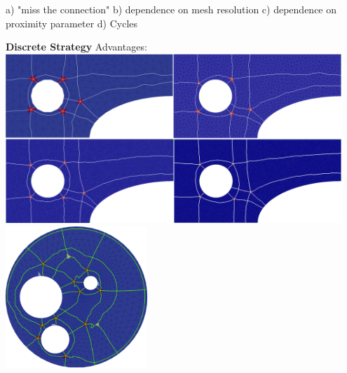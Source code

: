\documentclass[8pt]{beamer}
\begin{document}
{\begin{minipage}[!T]{1.0\linewidth}
\begin{minipage}[!T]{0.48\linewidth}
\begin{center}
\begin{flushleft}
\tiny a) "miss the connection"
\newline
\tiny b) dependence on mesh resolution
\newline
\tiny c) dependence on proximity parameter
\newline
\tiny d) Cycles
\end{flushleft}
\end{center}
\end{minipage}
\begin{minipage}[!T]{0.48\linewidth}
\begin{center}
\textbf{Discrete Strategy}
\newline
Advantages:
\newline
\includegraphics[width=0.95\textwidth]{HIS_collection}%
\newline
\includegraphics[width=0.4\textwidth]{CWCH_coarse-shortest_paths}
\end{center}
\end{minipage}
\end{minipage}
}
\end{document}
